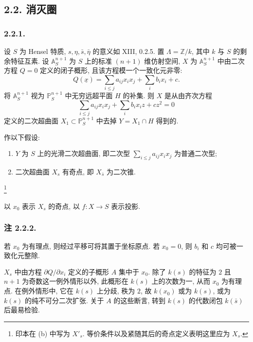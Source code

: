 \subsection*{2.2. 消灭圈}

\subsubsection*{2.2.1.}
设 $S$ 为 Hensel 特质, $s,\eta,\bar s,\bar\eta$ 的意义如 XIII, 0.2.5. 置 $\Lambda=\mathbb Z/k$, 其中 $k$ 与 $S$ 的剩余特征互素. 设 $\mathbb A^{n+1}_S$ 为 $S$ 上的标准 $(n+1)$ 维仿射空间, $X$ 为 $\mathbb A^{n+1}_S$ 中由二次方程 $Q=0$ 定义的闭子概形, 且该方程模一个一致化元非零:
\[
Q(\underline x)=\sum_{i\leq j}a_{ij}x_ix_j+\sum_i b_ix_i+c.
\]
将 $\mathbb A^{n+1}_S$ 视为 $\mathbb P^{n+1}_S$ 中无穷远超平面 $H$ 的补集. 则 $X$ 是从由齐次方程
\begin{equation}\tag{2.2.1.1}
\sum_{i\leq j}a_{ij}x_ix_j+\sum_i b_ix_iz+cz^2=0
\end{equation}
定义的二次超曲面 $X_1\subset\mathbb P^{n+1}_S$ 中去掉 $Y=X_1\cap H$ 得到的.

作以下假设:

\begin{enumerate}
\item[(a)] $Y$ 为 $S$ 上的光滑二次超曲面, 即二次型 $\sum_{i\leq j}a_{ij}x_ix_j$ 为普通二次型;

\item[(b)] 二次超曲面 $X_s$ 有奇点, 即 $X_{\bar s}$ 为二次锥.
\end{enumerate}
\footnote{印本在 (b) 中写为 $X'_s$. 等价条件以及紧随其后的奇点定义表明这里应为 $X_s$.}

以 $x_0$ 表示 $X_s$ 的奇点, 以 $f:X\to S$ 表示投影.

\subsubsection*{注 2.2.2.}
若 $x_0$ 为有理点, 则经过平移可将其置于坐标原点. 若 $x_0=0$, 则 $b_i$ 和 $c$ 均可被一致化元整除.

$X_s$ 中由方程 $\partial Q/\partial x_i$ 定义的子概形 $A$ 集中于 $x_0$. 除了 $k(s)$ 的特征为 $2$ 且 $n+1$ 为奇数这一例外情形以外, 此概形在 $k(s)$ 上的次数为一, 从而 $x_0$ 为有理点. 在例外情形中, 它在 $k(s)$ 上分歧, 秩为 $2$, 故 $k(x_0)$ 或为 $k(s)$, 或为 $k(s)$ 的纯不可分二次扩张. 关于 $A$ 的这些断言, 转到 $k(s)$ 的代数闭包 $k(\bar s)$ 后最易检验.

